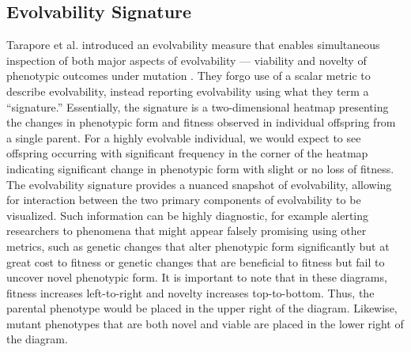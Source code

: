 \subsection{Evolvability Signature}
Tarapore et al. introduced an evolvability measure that enables simultaneous inspection of both major aspects of evolvability --- viability and novelty of phenotypic outcomes under mutation \cite{tarapore2015evolvability}.
They forgo use of a scalar metric to describe evolvability, instead reporting evolvability using what they term a ``signature.''
Essentially, the signature is a two-dimensional heatmap presenting the changes in phenotypic form and fitness observed in individual offspring from a single parent.
For a highly evolvable individual, we would expect to see offspring occurring with significant frequency in the corner of the heatmap indicating significant change in phenotypic form with slight or no loss of fitness.
The evolvability signature provides a nuanced snapshot of evolvability, allowing for interaction between the two primary components of evolvability to be visualized.
Such information can be highly diagnostic, for example alerting researchers to phenomena that might appear falsely promising using other metrics, such as genetic changes that alter phenotypic form significantly but at great cost to fitness or genetic changes that are beneficial to fitness but fail to uncover novel phenotypic form.
It is important to note that in these diagrams, fitness increases left-to-right and novelty increases top-to-bottom.
Thus, the parental phenotype would be placed in the upper right of the diagram.
Likewise, mutant phenotypes that are both novel and viable are placed in the lower right of the diagram.
